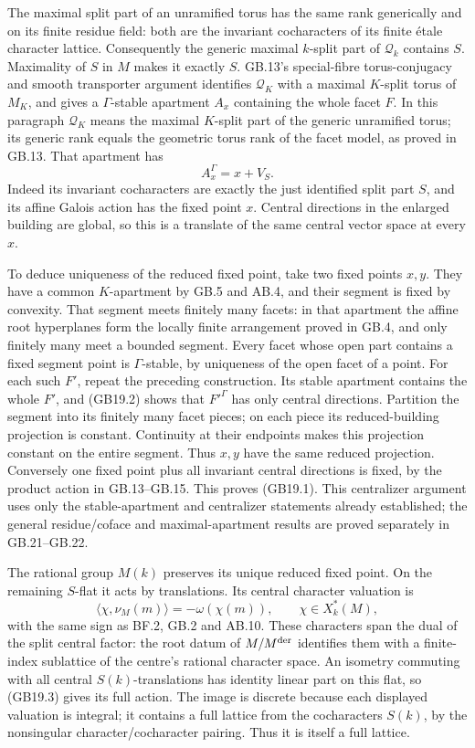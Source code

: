 \documentclass[
  11pt,
]{article}
\begin{document}
The maximal split part of an unramified torus has the same rank
generically and on its finite residue field: both are the invariant
cocharacters of its finite étale character lattice. Consequently the
generic maximal \(k\)-split part of \(\mathcal Q_k\) contains \(S\).
Maximality of \(S\) in \(M\) makes it exactly \(S\). GB.13's
special-fibre torus-conjugacy and smooth transporter argument identifies
\(\mathcal Q_K\) with a maximal \(K\)-split torus of \(M_K\), and gives
a \(\Gamma\)-stable apartment \(A_x\) containing the whole facet \(F\).
In this paragraph \(\mathcal Q_K\) means the maximal \(K\)-split part of
the generic unramified torus; its generic rank equals the geometric
torus rank of the facet model, as proved in GB.13. That apartment has \[
                       A_x^\Gamma=x+V_S.                   \tag{GB19.2}
\] Indeed its invariant cocharacters are exactly the just identified
split part \(S\), and its affine Galois action has the fixed point
\(x\). Central directions in the enlarged building are global, so this
is a translate of the same central vector space at every \(x\).

To deduce uniqueness of the reduced fixed point, take two fixed points
\(x,y\). They have a common \(K\)-apartment by GB.5 and AB.4, and their
segment is fixed by convexity. That segment meets finitely many facets:
in that apartment the affine root hyperplanes form the locally finite
arrangement proved in GB.4, and only finitely many meet a bounded
segment. Every facet whose open part contains a fixed segment point is
\(\Gamma\)-stable, by uniqueness of the open facet of a point. For each
such \(F'\), repeat the preceding construction. Its stable apartment
contains the whole \(F'\), and (GB19.2) shows that \(F'^\Gamma\) has
only central directions. Partition the segment into its finitely many
facet pieces; on each piece its reduced-building projection is constant.
Continuity at their endpoints makes this projection constant on the
entire segment. Thus \(x,y\) have the same reduced projection.
Conversely one fixed point plus all invariant central directions is
fixed, by the product action in GB.13--GB.15. This proves (GB19.1). This
centralizer argument uses only the stable-apartment and centralizer
statements already established; the general residue/coface and
maximal-apartment results are proved separately in GB.21--GB.22.

The rational group \(M(k)\) preserves its unique reduced fixed point. On
the remaining \(S\)-flat it acts by translations. Its central character
valuation is \[
 \langle\chi,\nu_M(m)\rangle=-\omega(\chi(m)),
                       \qquad \chi\in X_k^*(M),             \tag{GB19.3}
\] with the same sign as BF.2, GB.2 and AB.10. These characters span the
dual of the split central factor: the root datum of \(M/M^{\rm der}\)
identifies them with a finite-index sublattice of the centre's rational
character space. An isometry commuting with all central
\(S(k)\)-translations has identity linear part on this flat, so (GB19.3)
gives its full action. The image is discrete because each displayed
valuation is integral; it contains a full lattice from the cocharacters
\(S(k)\), by the nonsingular character/cocharacter pairing. Thus it is
itself a full lattice.
\end{document}
